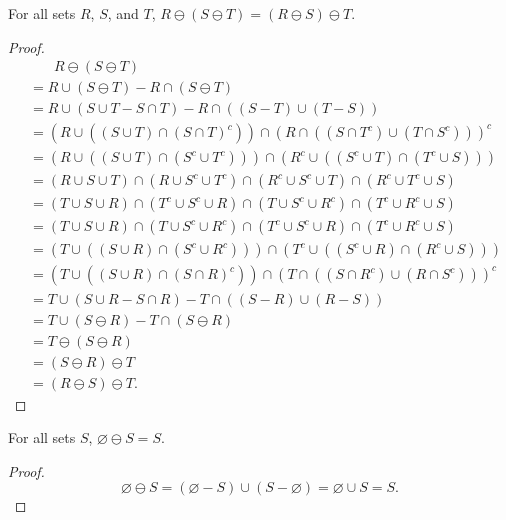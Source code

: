 \documentclass[../../math.tex]{subfiles}
\begin{document}
\begin{theorem}
    For all sets $R$, $S$, and $T$, $R \ominus (S \ominus T) = (R \ominus S)
    \ominus T$.
\end{theorem}
\begin{proof}
    \begin{align*}
        &\phantom{=}\ \ R \ominus (S \ominus T) \\
        &= R \cup (S \ominus T) - R \cap (S \ominus T) \\
        &= R \cup (S \cup T - S \cap T) - R \cap ((S - T) \cup (T - S)) \\
        &= (R \cup ((S \cup T) \cap (S \cap T)^c)) \cap
            (R \cap ((S \cap T^c) \cup (T \cap S^c)))^c \\
        &= (R \cup ((S \cup T) \cap (S^c \cup T^c))) \cap
            (R^c \cup ((S^c \cup T) \cap (T^c \cup S))) \\
        &= (R \cup S \cup T) \cap (R \cup S^c \cup T^c) \cap
            (R^c \cup S^c \cup T) \cap (R^c \cup T^c \cup S) \\
        &= (T \cup S \cup R) \cap (T^c \cup S^c \cup R) \cap
            (T \cup S^c \cup R^c) \cap (T^c \cup R^c \cup S) \\
        &= (T \cup S \cup R) \cap (T \cup S^c \cup R^c) \cap
            (T^c \cup S^c \cup R) \cap (T^c \cup R^c \cup S) \\
        &= (T \cup ((S \cup R) \cap (S^c \cup R^c))) \cap
            (T^c \cup ((S^c \cup R) \cap (R^c \cup S))) \\
        &= (T \cup ((S \cup R) \cap (S \cap R)^c)) \cap
            (T \cap ((S \cap R^c) \cup (R \cap S^c)))^c \\
        &= T \cup (S \cup R - S \cap R) - T \cap ((S - R) \cup (R - S)) \\
        &= T \cup (S \ominus R) - T \cap (S \ominus R) \\
        &= T \ominus (S \ominus R) \\
        &= (S \ominus R) \ominus T \\
        &= (R \ominus S) \ominus T.
    \end{align*}
\end{proof}

\begin{theorem}
    For all sets $S$, $\varnothing \ominus S = S$.
\end{theorem}
\begin{proof}
    \[
        \varnothing \ominus S = (\varnothing - S) \cup (S - \varnothing)
        = \varnothing \cup S = S.
    \]
\end{proof}
\end{document}
